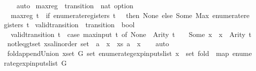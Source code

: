 \begin{isabellebody}
\ \ \isamarkupfalse%
\ auto%
\endisatagproof
{\isafoldproof}%
%
\isadelimproof
\isanewline
%
\endisadelimproof
\isanewline
{}\isamarkupfalse%
\ max{\isacharunderscore}reg\ {\isacharcolon}{\isacharcolon}\ {\isachardoublequoteopen}transition\ {\isasymRightarrow}\ nat\ option{\isachardoublequoteclose}\ \isanewline
\ \ {\isachardoublequoteopen}max{\isacharunderscore}reg\ t\ {\isacharequal}\ {\isacharparenleft}if\ enumerate{\isacharunderscore}registers\ t\ {\isacharequal}\ {\isacharbraceleft}{\isacharbraceright}\ then\ None\ else\ Some\ {\isacharparenleft}Max\ {\isacharparenleft}enumerate{\isacharunderscore}registers\ t{\isacharparenright}{\isacharparenright}{\isacharparenright}{\isachardoublequoteclose}\isanewline
\isanewline
{}\isamarkupfalse%
\ valid{\isacharunderscore}transition\ {\isacharcolon}{\isacharcolon}\ {\isachardoublequoteopen}transition\ {\isasymRightarrow}\ bool{\isachardoublequoteclose}\ \isanewline
\ \ {\isachardoublequoteopen}valid{\isacharunderscore}transition\ t\ {\isacharequal}\ {\isacharparenleft}case\ max{\isacharunderscore}input\ t\ of\ None\ {\isasymRightarrow}\ Arity\ t\ {\isacharequal}\ {}\ {\isacharbar}\ Some\ x\ {\isasymRightarrow}\ x\ {\isacharless}\ Arity\ t{\isacharparenright}{\isachardoublequoteclose}\isanewline
\isanewline
{}\isamarkupfalse%
\ not{\isacharunderscore}leq{\isacharunderscore}gt{\isacharunderscore}set{\isacharcolon}\ {\isachardoublequoteopen}{\isacharparenleft}{\isasymforall}x{\isasymin}{\isacharparenleft}s{\isacharcolon}{\isacharcolon}{\isacharparenleft}{\isacharprime}a{\isacharcolon}{\isacharcolon}linorder{\isacharparenright}\ set{\isacharparenright}{\isachardot}\ {\isasymnot}\ a\ {\isasymle}\ x{\isacharparenright}\ {\isacharequal}\ {\isacharparenleft}{\isasymforall}x{\isasymin}s{\isachardot}\ a\ {\isachargreater}\ x{\isacharparenright}{\isachardoublequoteclose}\isanewline
%
\isadelimproof
\ \ %
\endisadelimproof
%
\isatagproof
{}\isamarkupfalse%
\ auto%
\endisatagproof
{\isafoldproof}%
%
\isadelimproof
\isanewline
%
\endisadelimproof
\isanewline
{}\isamarkupfalse%
\ fold{\isacharunderscore}append{\isacharunderscore}Union{\isacharcolon}\ {\isachardoublequoteopen}{\isacharparenleft}{\isasymUnion}x{\isasymin}set\ G{\isachardot}\ set\ {\isacharparenleft}enumerate{\isacharunderscore}gexp{\isacharunderscore}inputs{\isacharunderscore}list\ x{\isacharparenright}{\isacharparenright}\ {\isacharequal}\ set\ {\isacharparenleft}fold\ {\isacharparenleft}{\isacharat}{\isacharparenright}\ {\isacharparenleft}map\ enumerate{\isacharunderscore}gexp{\isacharunderscore}inputs{\isacharunderscore}list\ G{\isacharparenright}\ {\isacharbrackleft}{\isacharbrackright}{\isacharparenright}{\isachardoublequoteclose}\isanewline

\end{isabellebody}
